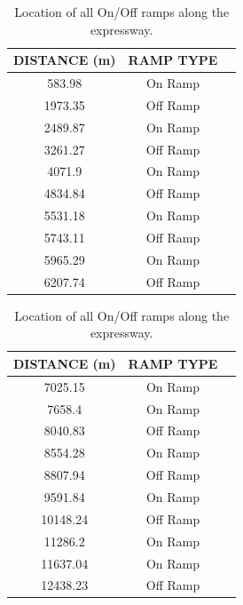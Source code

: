\documentclass[12pt]{article}
\begin{document}
\begin{table}[!ht]
 \centering
\begin{tabular}[b]{ccc}\hline
      {\bf DISTANCE} (m) & {\bf RAMP TYPE} \\ \hline
     583.98 & On Ramp \\ 
     1973.35 & Off Ramp \\ 
     2489.87 & On Ramp \\ 
     3261.27 & Off Ramp \\ 
     4071.9 & On Ramp \\ 
     4834.84 & Off Ramp \\ 
     5531.18 & On Ramp \\ 
     5743.11 & Off Ramp \\ 
     5965.29 & On Ramp \\ 
     6207.74 & Off Ramp \\ \hline
     \end{tabular}
     \quad
     \begin{tabular}[b]{ccc}\hline
       {\bf DISTANCE} (m) & {\bf RAMP TYPE} \\ \hline
     7025.15 & On Ramp \\ 
     7658.4 & On Ramp \\ 
     8040.83 & Off Ramp \\ 
     8554.28 & On Ramp \\ 
     8807.94 & Off Ramp\\ 
     9591.84 & On Ramp \\ 
     10148.24 & Off Ramp \\ 
     11286.2 & On Ramp \\ 
     11637.04 & On Ramp \\ 
     12438.23 & Off Ramp \\  \hline
    \end{tabular}
      \caption{Location of all On/Off ramps along the expressway.}
      \label{table:on-off-ramp}
\end{table}
\end{document}
